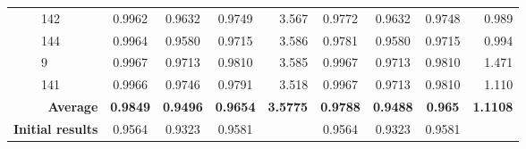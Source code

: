 \begin{table}
\begin{tabular}{ll|cccr|cccr}
        & 142 & 0.9962 & 0.9632 & 0.9749 & 3.567 & 0.9772 & 0.9632 & 0.9748 & 0.989\\
        & 144 & 0.9964 & 0.9580 & 0.9715 & 3.586 & 0.9781 & 0.9580 & 0.9715 & 0.994\\
        & 9 & 0.9967 & 0.9713 & 0.9810 & 3.585 & 0.9967 & 0.9713 & 0.9810 & 1.471\\
        & 141 & 0.9966 & 0.9746 & 0.9791 & 3.518 & 0.9967 & 0.9713 & 0.9810 & 1.110\\
        \cmidrule{1-10}
        \multicolumn{2}{r|}{\textbf{Average}} & \textbf{0.9849} & \textbf{0.9496} & \textbf{0.9654} & \textbf{3.5775} & \textbf{0.9788} & \textbf{0.9488} & \textbf{0.965} & \textbf{1.1108}\\
        \cmidrule{1-10}
        \multicolumn{2}{r|}{\textbf{Initial results}} & 0.9564 & 0.9323 & 0.9581 & & 0.9564 & 0.9323 & 0.9581 & \\
        \bottomrule
    \end{tabular}
    \normalsize
\end{table}
\renewcommand{\arraystretch}{1}

